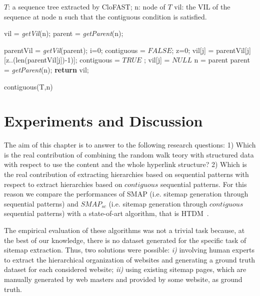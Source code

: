 \begin{algorithm}[tb]
\begin{algorithmic}[1]
\renewcommand{\algorithmicrequire}{\textbf{Input:}}
\renewcommand{\algorithmicensure}{\textbf{Output:}}
\newcommand{\RETURN}[1]{\textbf{return} #1}
\renewcommand{\algorithmiccomment}[1]{$//$ \textit{#1}}
\newcommand{\getPos}[1]{ \textit{getPos}(#1); }
\newcommand{\length}[1]{ \textit{length}(#1); }
\newcommand{\shift}[1]{ \textit{next}(#1); }
\newcommand{\getVil}[1]{ \textit{getVil}(#1); }
\newcommand{\getParent}[1]{ \textit{getParent}(#1); }
\REQUIRE $T$: a sequence tree extracted by CloFAST; n: node of $T$
\ENSURE vil: the VIL of the sequence at node n such that the contiguous condition is satisfied.

\STATE vil = \getVil{n}
\STATE parent = \getParent{n}
\REPEAT 

	\STATE parentVil = \getVil{parent}
	\FORALL{ $j = 1 \ldots$\length{vil}}
		\STATE i=0; 	contiguous =  $FALSE$;
		\REPEAT
				\STATE z=0;
				\REPEAT
					\STATE vil[j] = parentVil[j][z..(len(parentVil[j])-1)];
					\STATE contiguous = $TRUE$ ;
				\ENDIF
				\STATE vil[j] = $NULL$\;				
			\ENDIF
	\ENDFOR
\STATE n = parent
\STATE parent = \getParent{n}\;
\RETURN vil;
\caption{contiguous(T,n)}
\label{alg:contiguos}
\end{algorithmic}
\end{algorithm}




\section{Experiments and Discussion}
\label{sec:experiments}
The aim of this chapter is to answer to the following research questions: 1) Which is the real contribution of combining the random walk teory with structured data with respect to use the content and the whole hyperlink structure? 2) Which is the real contribution of extracting hierarchies based on  sequential patterns with respect to extract hierarchies based on $contiguous$ sequential patterns. 
For this reason we compare the performances of SMAP (i.e. sitemap generation through sequential patterns) and $SMAP_{sc}$ (i.e. sitemap generation through $contiguous$ sequential patterns) with a state-of-art algorithm, that is HTDM~\cite{Weninger:2012}.

The empirical evaluation of these algorithms was not a trivial task because, at the best of our knowledge, there is no dataset generated for the specific task of sitemap extraction. 
Thus, two solutions were possible: \emph{i)} involving human experts to extract the hierarchical organization of websites and generating a ground truth dataset for each considered website; \emph{ii)} using existing sitemap pages, which are manually generated by web masters and provided by some website, as ground truth. 


